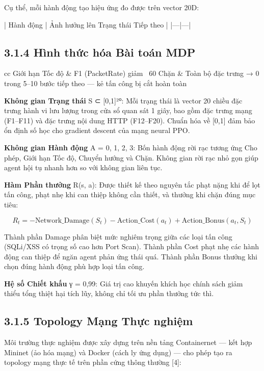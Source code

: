 \documentclass[12pt,a4paper,twoside]{report}
\begin{document}
{Cụ thể, mỗi hành động tạo hiệu ứng đo được trên vector 20D:

| Hành động | Ảnh hưởng lên Trạng thái Tiếp theo |
|---|---|

\subsection{3.1.4 Hình thức hóa Bài toán MDP}


\begin{tabular}{cc}
\hline
Giới hạn Tốc độ & F1 (PacketRate) giảm ~60%
\hline
Chặn & Toàn bộ đặc trưng → 0 trong 5–10 bước tiếp theo — kẻ tấn công bị cắt hoàn toàn \\
\hline
\end{tabular}

\textbf{Không gian Trạng thái} S ⊂ [0,1]²⁰: Mỗi trạng thái là vector 20 chiều đặc trưng hành vi lưu lượng trong cửa sổ quan sát 1 giây, bao gồm đặc trưng mạng (F1–F11) và đặc trưng nội dung HTTP (F12–F20). Chuẩn hóa về [0,1] đảm bảo ổn định số học cho gradient descent của mạng neural PPO.

\textbf{Không gian Hành động} A = {0, 1, 2, 3}: Bốn hành động rời rạc tương ứng Cho phép, Giới hạn Tốc độ, Chuyển hướng và Chặn. Không gian rời rạc nhỏ gọn giúp agent hội tụ nhanh hơn so với không gian liên tục.

\textbf{Hàm Phần thưởng} R(s, a): Được thiết kế theo nguyên tắc phạt nặng khi để lọt tấn công, phạt nhẹ khi can thiệp không cần thiết, và thưởng khi chặn đúng mục tiêu:

$$R_t = -\text{Network\_Damage}(S_t) - \text{Action\_Cost}(a_t) + \text{Action\_Bonus}(a_t, S_t)$$

Thành phần Damage phân biệt mức nghiêm trọng giữa các loại tấn công (SQLi/XSS có trọng số cao hơn Port Scan). Thành phần Cost phạt nhẹ các hành động can thiệp để ngăn agent phản ứng thái quá. Thành phần Bonus thưởng khi chọn đúng hành động phù hợp loại tấn công.

\textbf{Hệ số Chiết khấu} γ = 0,99: Giá trị cao khuyến khích học chính sách giảm thiểu tổng thiệt hại tích lũy, không chỉ tối ưu phần thưởng tức thì.

\subsection{3.1.5 Topology Mạng Thực nghiệm}

Môi trường thực nghiệm được xây dựng trên nền tảng Containernet — kết hợp Mininet (ảo hóa mạng) và Docker (cách ly ứng dụng) — cho phép tạo ra topology mạng thực tế trên phần cứng thông thường [4]:

}
\end{document}
